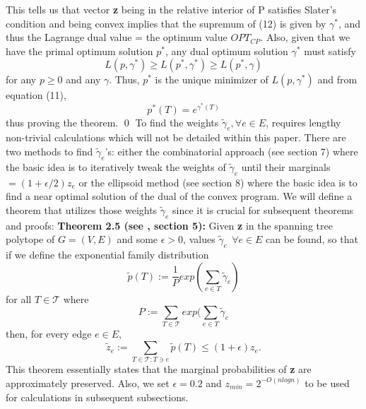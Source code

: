 \documentclass[oneside]{projectpaper} %
\begin{document}
This tells us that vector \textbf{z} being in the relative interior of P satisfies Slater's condition and being convex implies that the supremum of (12) is given by $\gamma^*$, and thus the Lagrange dual value = the optimum value $OPT_{CP}$. Also, given that we have the primal optimum solution $p^*$, any dual optimum solution $\gamma^*$ must satisfy
\begin{equation}
L(p,\gamma^*) \geq L(p^*,\gamma^*) \geq L(p^*,\gamma)
\end{equation}
for any $p \geq 0$ and any $\gamma$. Thus, $p^*$ is the unique minimizer of $L(p,\gamma^*)$ and from equation (11),
\begin{equation}
p^*(T) = e^{\gamma^*(T)}
\end{equation}
thus proving the theorem. \hfill \qed
\newline
\newline
\indent To find the weights $\tilde{\gamma}_{e}, \forall e \in E$, requires lengthy non-trivial calculations which will not be detailed within this paper. There are two methods to find $\tilde{\gamma}_{e}$'s: either the combinatorial approach (see \cite{AGM10} section 7) where the basic idea is to iteratively tweak the weights of $\tilde{\gamma}_{e}$ until their marginals $= (1 + \epsilon/2)z_e$ or the ellipsoid method (see \cite{AGM10} section 8) where the basic idea is to find a near optimal solution of the dual of the convex program. We will define a theorem that utilizes those weights $\tilde{\gamma}_{e}$ since it is crucial for subsequent theorems and proofs:
\newline
\newline
\textbf{Theorem 2.5 (see \cite{AGM10}, section 5):} Given \textbf{z} in the spanning tree polytope of $G = (V, E)$ and some $\epsilon > 0$, values $\tilde{\gamma}_e \ \ \forall e \in E$ can be found, so that if we define the exponential family distribution
\begin{equation*}
\tilde{p}(T) := \frac{1}{P}exp(\sum\limits_{e \in T}\tilde{\gamma}_e)
\end{equation*}
for all $T \in \mathcal{T}$ where 
\begin{equation*}
P := \sum\limits_{T \in \mathcal{T}}exp(\sum\limits_{e \in T}\tilde{\gamma}_e
\end{equation*}
then, for every edge $e \in E$,
\begin{equation*}
\tilde{z}_e := \sum\limits_{T \in \mathcal{T} : T \ni e}\tilde{p}(T) \leq (1 + \epsilon)z_e.
\end{equation*}
This theorem essentially states that the marginal probabilities of \textbf{z} are approximately preserved. Also, we set $\epsilon = 0.2$ and $z_{min} = 2^{-O(nlogn)}$ to be used for calculations in subsequent subsections. \newline
\end{document}

